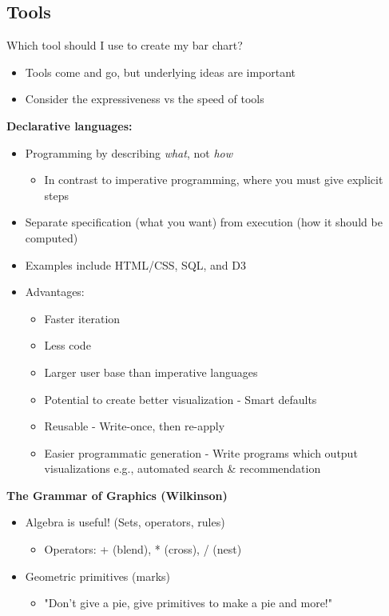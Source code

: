 \subsection{Tools}
Which tool should I use to create my bar chart?
\begin{itemize}
	\item Tools come and go, but underlying ideas are important
	\item Consider the expressiveness vs the speed of tools
\end{itemize}
\textbf{Declarative languages:}
\begin{itemize}
	\item Programming by describing \emph{what}, not \emph{how}
	\begin{itemize}
		\item In contrast to imperative programming, where you must give explicit steps
	\end{itemize}
	\item Separate specification (what you want) from execution (how it should be computed)
	\item Examples include HTML/CSS, SQL, and D3
	\item Advantages:
	\begin{itemize}
		\item Faster iteration
		\item Less code
		\item Larger user base than imperative languages
		\item Potential to create better visualization - Smart defaults
		\item Reusable - Write-once, then re-apply
		\item Easier programmatic generation - Write programs which output visualizations e.g., automated search \& recommendation
	\end{itemize}	
\end{itemize}
\textbf{The Grammar of Graphics (Wilkinson)}
\begin{itemize}
	\item Algebra is useful! (Sets, operators, rules)
	\begin{itemize}
		\item Operators: + (blend), * (cross), / (nest)
	\end{itemize}
	\item Geometric primitives (marks)
	\begin{itemize}
		\item "Don't give a pie, give primitives to make a pie and more!"
	\end{itemize}
\end{itemize}

